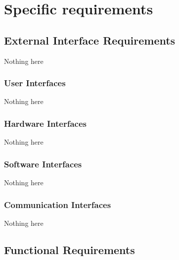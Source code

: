 \section{Specific requirements}

\subsection{External Interface Requirements}
Nothing here

\subsubsection{User Interfaces}
Nothing here

\subsubsection{Hardware Interfaces}
Nothing here

\subsubsection{Software Interfaces}
Nothing here

\subsubsection{Communication Interfaces}
Nothing here


\subsection{Functional Requirements}
